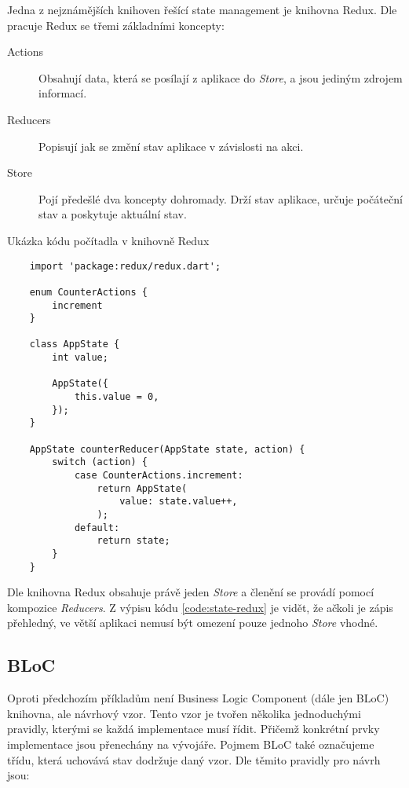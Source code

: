 Jedna z nejznámějších knihoven řešící state management je knihovna Redux.
Dle \cite{redux_basics} pracuje Redux se třemi základními koncepty:

\begin{description}
    \item[Actions] Obsahují data,
    která se posílají z aplikace do \emph{Store},
    a jsou jediným zdrojem informací.
    \item[Reducers] Popisují jak se změní stav aplikace v závislosti na akci.
    \item[Store] Pojí předešlé dva koncepty dohromady.
    Drží stav aplikace,
    určuje počáteční stav
    a poskytuje aktuální stav.
\end{description}

\begin{listing}
    \caption{Ukázka kódu počítadla v knihovně Redux \cite{redux_basics}}
    \label{code:state-redux}
    \begin{verbatim}
    import 'package:redux/redux.dart';

    enum CounterActions {
        increment
    }
    
    class AppState {
        int value;
    
        AppState({ 
            this.value = 0,
        });
    }
    
    AppState counterReducer(AppState state, action) {
        switch (action) {
            case CounterActions.increment:
                return AppState(
                    value: state.value++,
                );
            default:
                return state;
        }
    }
    \end{verbatim}
\end{listing}

Dle \cite{redux_basics} knihovna Redux obsahuje právě jeden \emph{Store}
a členění se provádí pomocí kompozice \emph{Reducers}.
Z výpisu kódu \ref{code:state-redux} je vidět,
že ačkoli je zápis přehledný,
ve větší aplikaci nemusí být omezení pouze jednoho \emph{Store} vhodné.

\subsection{BLoC}

Oproti předchozím příkladům není Business Logic Component (dále jen BLoC)
knihovna,
ale návrhový vzor.
Tento vzor je tvořen několika jednoduchými pravidly,
kterými se každá implementace musí řídit.
Přičemž konkrétní prvky implementace jsou přenechány na vývojáře.
Pojmem BLoC také označujeme třídu,
která uchovává stav dodržuje daný vzor. 
Dle \cite{googledevelopers_bloc} těmito pravidly pro návrh jsou:

